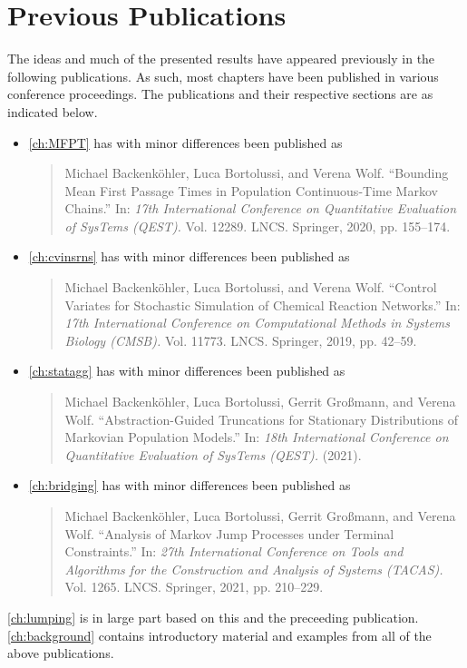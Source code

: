 \section{Previous Publications}%
The ideas and much of the presented results have appeared previously in the following publications.
As such, most chapters have been published in various conference proceedings.
The publications and their respective sections are as indicated below.

\begin{itemize}

\item \autoref{ch:MFPT} has with minor differences been published as
\begin{quote}
	Michael Backenköhler, Luca Bortolussi, and Verena
Wolf. ``Bounding Mean First Passage Times in
	Population Con\-tin\-uo\-us-Time Markov Chains.'' In: \emph{17th
International Conference on Quantitative Evaluation of
	SysTems (QEST).} Vol. 12289. LNCS. Springer, 2020,
pp. 155--174.
\end{quote}

\item \autoref{ch:cvinsrns} has with minor differences been published as
\begin{quote}
	Michael Backenköhler, Luca Bortolussi, and Verena
Wolf. ``Control Variates for Stochastic Simulation of
	Chemical Reaction Networks.'' In: \emph{17th International
	Conference on Computational Methods in Systems Biology (CMSB).} Vol. 11773. LNCS. Springer, 2019,
pp. 42--59.
\end{quote}

\item \autoref{ch:statagg} has with minor differences been published as
\begin{quote}
	Michael Backenköhler, Luca Bortolussi, Gerrit Großmann, and Verena Wolf. ``Abstracti\-on-Guid\-ed Truncations
for Stationary Distributions of Markovian
	Population Models.'' In: \emph{18th
International Conference on Quantitative Evaluation of
	SysTems (QEST).} (2021).
\end{quote}

	\item \autoref{ch:bridging} has with minor differences been published as

\begin{quote}
	Michael Backenköhler, Luca Bortolussi, Gerrit Großmann, and Verena Wolf.
	``Analysis of Markov Jump Processes under Terminal Constraints.''
	In: \emph{27th International Conference on Tools and Algorithms for
	the Construction and Analysis of Systems (TACAS).}  Vol. 1265. LNCS.
	Springer, 2021, pp. 210--229.
\end{quote}
\end{itemize}
\autoref{ch:lumping} is in large part based on this and the preceeding publication.
\autoref{ch:background} contains introductory material and examples from all of the above publications.

